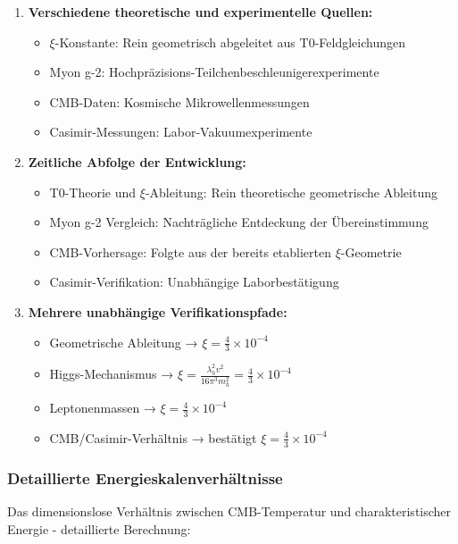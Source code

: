 \documentclass[12pt,a4paper]{article}
\begin{document}
	\begin{enumerate}
		\item \textbf{Verschiedene theoretische und experimentelle Quellen:}
		\begin{itemize}
			\item $\xi$-Konstante: Rein geometrisch abgeleitet aus T0-Feldgleichungen
			\item Myon g-2: Hochpräzisions-Teilchenbeschleunigerexperimente
			\item CMB-Daten: Kosmische Mikrowellenmessungen
			\item Casimir-Messungen: Labor-Vakuumexperimente
		\end{itemize}
		
		\item \textbf{Zeitliche Abfolge der Entwicklung:}
		\begin{itemize}
			\item T0-Theorie und $\xi$-Ableitung: Rein theoretische geometrische Ableitung
			\item Myon g-2 Vergleich: Nachträgliche Entdeckung der Übereinstimmung
			\item CMB-Vorhersage: Folgte aus der bereits etablierten $\xi$-Geometrie
			\item Casimir-Verifikation: Unabhängige Laborbestätigung
		\end{itemize}
		
		\item \textbf{Mehrere unabhängige Verifikationspfade:}
		\begin{itemize}
			\item Geometrische Ableitung → $\xi = \frac{4}{3} \times 10^{-4}$
			\item Higgs-Mechanismus → $\xi = \frac{\lambda_h^2 v^2}{16\pi^3 m_h^2} = \frac{4}{3} \times 10^{-4}$
			\item Leptonenmassen → $\xi = \frac{4}{3} \times 10^{-4}$
			\item CMB/Casimir-Verhältnis → bestätigt $\xi = \frac{4}{3} \times 10^{-4}$
		\end{itemize}
	\end{enumerate}
	
	\subsubsection{Detaillierte Energieskalenverhältnisse}
	
	Das dimensionslose Verhältnis zwischen CMB-Temperatur und charakteristischer Energie - detaillierte Berechnung:
	
\end{document}
